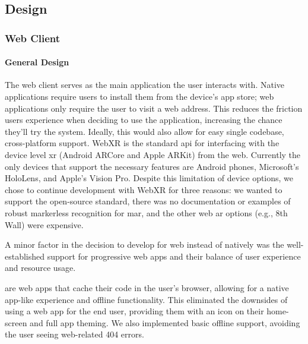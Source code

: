 \documentclass[thesis]{fputhesis}
\begin{document}
\begin{body}
\subsection{Design}
\subsubsection{Web Client}
\paragraph{General Design}
The web client serves as the main application the user interacts with. Native applications require users to install them from the device's app store; web applications only require the user to visit a web address. This reduces the friction users experience when deciding to use the application, increasing the chance they'll try the system. Ideally, this would also allow for easy single codebase, cross-platform support. WebXR is the standard \acrshort{api} for interfacing with the device level \acrshort{xr}  (Android ARCore and Apple ARKit) from the web.  Currently the only devices that support the necessary features are Android phones, Microsoft's HoloLens, and Apple's Vision Pro. Despite this limitation of device options, we chose to continue development with WebXR for three reasons: we wanted to support the open-source standard, there was no documentation or examples of robust markerless recognition for \acrshort{mar}, and the other web \acrshort{ar} options (e.g., 8th Wall) were expensive.

A minor factor in the decision to develop for web instead of natively was the well-established support for progressive web apps and their balance of user experience and resource usage. 

 are web apps that cache their code in the user's browser, allowing for a native app-like experience and offline functionality. This eliminated the downsides of using a web app for the end user, providing them with an icon on their home-screen and full app theming. We also implemented basic offline support, avoiding the user seeing web-related 404 errors.


\end{body}
\end{document}
